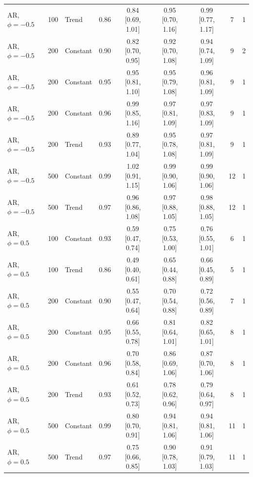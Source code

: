 \begin{tabular}{lrlcccccc}
AR, $\phi = -0.5$ & 100 & Trend & 0.86 & 0.84 [0.69, 1.01] & 0.95 [0.70, 1.16] & 0.99 [0.77, 1.17] & 7 & 1 \\
AR, $\phi = -0.5$ & 200 & Constant & 0.90 & 0.82 [0.70, 0.95] & 0.92 [0.70, 1.08] & 0.94 [0.74, 1.09] & 9 & 2 \\
AR, $\phi = -0.5$ & 200 & Constant & 0.95 & 0.95 [0.81, 1.10] & 0.95 [0.79, 1.08] & 0.96 [0.81, 1.09] & 9 & 1 \\
AR, $\phi = -0.5$ & 200 & Constant & 0.96 & 0.99 [0.85, 1.16] & 0.97 [0.81, 1.09] & 0.97 [0.83, 1.09] & 9 & 1 \\
AR, $\phi = -0.5$ & 200 & Trend & 0.93 & 0.89 [0.77, 1.04] & 0.95 [0.78, 1.08] & 0.97 [0.81, 1.09] & 9 & 1 \\
AR, $\phi = -0.5$ & 500 & Constant & 0.99 & 1.02 [0.91, 1.15] & 0.99 [0.90, 1.06] & 0.99 [0.90, 1.06] & 12 & 1 \\
AR, $\phi = -0.5$ & 500 & Trend & 0.97 & 0.96 [0.86, 1.08] & 0.97 [0.88, 1.05] & 0.98 [0.88, 1.05] & 12 & 1 \\
\addlinespace
AR, $\phi = 0.5$ & 100 & Constant & 0.93 & 0.59 [0.47, 0.74] & 0.75 [0.53, 1.00] & 0.76 [0.55, 1.01] & 6 & 1 \\
AR, $\phi = 0.5$ & 100 & Trend & 0.86 & 0.49 [0.40, 0.61] & 0.65 [0.44, 0.88] & 0.66 [0.45, 0.89] & 5 & 1 \\
AR, $\phi = 0.5$ & 200 & Constant & 0.90 & 0.55 [0.47, 0.64] & 0.70 [0.54, 0.88] & 0.72 [0.56, 0.89] & 7 & 1 \\
AR, $\phi = 0.5$ & 200 & Constant & 0.95 & 0.66 [0.55, 0.78] & 0.81 [0.64, 1.01] & 0.82 [0.65, 1.01] & 8 & 1 \\
AR, $\phi = 0.5$ & 200 & Constant & 0.96 & 0.70 [0.58, 0.84] & 0.86 [0.69, 1.06] & 0.87 [0.70, 1.06] & 8 & 1 \\
AR, $\phi = 0.5$ & 200 & Trend & 0.93 & 0.61 [0.52, 0.73] & 0.78 [0.62, 0.96] & 0.79 [0.64, 0.97] & 8 & 1 \\
AR, $\phi = 0.5$ & 500 & Constant & 0.99 & 0.80 [0.70, 0.91] & 0.94 [0.81, 1.06] & 0.94 [0.81, 1.06] & 11 & 1 \\
AR, $\phi = 0.5$ & 500 & Trend & 0.97 & 0.75 [0.66, 0.85] & 0.90 [0.78, 1.03] & 0.91 [0.79, 1.03] & 11 & 1 \\
\bottomrule
\end{tabular}
